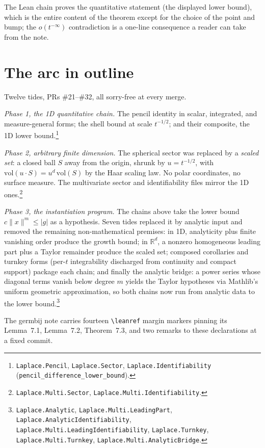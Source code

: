 \documentclass[11pt]{article}
\begin{document}
The Lean chain proves the quantitative statement (the displayed lower
bound), which is the entire content of the theorem except for the choice
of the point and bump; the $o(t^{-\infty})$ contradiction is a one-line
consequence a reader can take from the note.

\section{The arc in outline}

Twelve tides, PRs \#21--\#32, all sorry-free at every merge.

\emph{Phase 1, the 1D quantitative chain.} The pencil identity in
scalar, integrated, and measure-general forms; the shell bound at scale
$t^{-1/2}$; and their composite, the 1D lower
bound.\footnote{\texttt{Laplace.Pencil}, \texttt{Laplace.Sector},
\texttt{Laplace.Identifiability}
(\texttt{pencil\_difference\_lower\_bound}).}

\emph{Phase 2, arbitrary finite dimension.} The spherical sector was
replaced by a \emph{scaled set}: a closed ball $S$ away from the origin,
shrunk by $u = t^{-1/2}$, with $\mathrm{vol}(u \cdot S) = u^d\,
\mathrm{vol}(S)$ by the Haar scaling law. No polar coordinates, no
surface measure. The multivariate sector and identifiability files
mirror the 1D ones.\footnote{\texttt{Laplace.Multi.Sector},
\texttt{Laplace.Multi.Identifiability}.}

\emph{Phase 3, the instantiation program.} The chains above take the
lower bound $c\|x\|^m \leq |g|$ as a hypothesis. Seven tides replaced it
by analytic input and removed the remaining non-mathematical premises:
in 1D, analyticity plus finite vanishing order produce the growth bound;
in $\mathbb{R}^d$, a nonzero homogeneous leading part plus a Taylor
remainder produce the scaled set; composed corollaries and turnkey forms
(per-$t$ integrability discharged from continuity and compact support)
package each chain; and finally the analytic bridge: a power series
whose diagonal terms vanish below degree $m$ yields the Taylor
hypotheses via Mathlib's uniform geometric approximation, so both chains
now run from analytic data to the lower
bound.\footnote{\texttt{Laplace.Analytic},
\texttt{Laplace.Multi.LeadingPart},
\texttt{Laplace.AnalyticIdentifiability},
\texttt{Laplace.Multi.LeadingIdentifiability}, \texttt{Laplace.Turnkey},
\texttt{Laplace.Multi.Turnkey}, \texttt{Laplace.Multi.AnalyticBridge}.}

The germbij note carries fourteen \texttt{\textbackslash leanref} margin
markers pinning its Lemma~7.1, Lemma~7.2, Theorem~7.3, and two remarks to
these declarations at a fixed commit.
\end{document}

